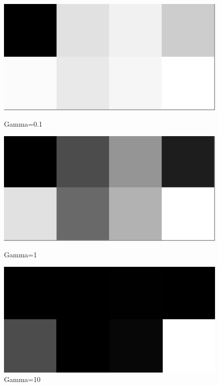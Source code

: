 \documentclass[course=erap]{aspdoc}
\begin{document}
\begin{figure}[h]
\begin{minipage}{0.3\textwidth}
\centering
\includegraphics[width=\textwidth]{Bilder/gamma0.1.pgm.png}
\caption{Gamma=0.1}
\end{minipage}
\hfill
\begin{minipage}{0.3\textwidth}
\centering
\includegraphics[width=\textwidth]{Bilder/gamma1.pgm.png}
\caption{Gamma=1}
\end{minipage}
\hfill
\begin{minipage}{0.3\textwidth}
\centering
\includegraphics[width=\textwidth]{Bilder/gamma10.pgm.png}
\caption{Gamma=10}
\end{minipage}
\end{figure}
\end{document}
